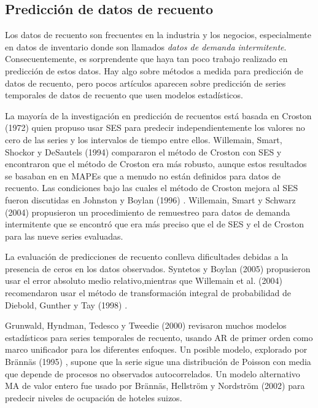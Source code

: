\documentclass{llncs}
\begin{document}
\subsection{Predicción de datos de recuento}
Los datos de recuento son frecuentes en la industria y los negocios, especialmente en datos de inventario donde son llamados \emph{datos de demanda intermitente}. Consecuentemente, es sorprendente que haya tan poco trabajo realizado en predicción de estos datos. Hay algo sobre métodos a medida para predicción de datos de recuento, pero pocos artículos aparecen sobre predicción de series temporales de datos de recuento que usen modelos estadísticos.

La mayoría de la investigación en predicción de recuentos está basada en Croston (1972) \cite{Croston1972289} quien propuso usar SES para predecir independientemente los valores no cero de las series y los intervalos de tiempo entre ellos. Willemain, Smart, Shockor y DeSautels (1994) \cite{Willemain1994529} compararon el método de Croston con SES y encontraron que el método de Croston era más robusto, aunque estos resultados se basaban en en MAPEs que a menudo no están definidos para datos de recuento. Las condiciones bajo las cuales el método de Croston mejora al SES fueron discutidas en Johnston y Boylan (1996) \cite{Johnston1996297}. Willemain, Smart y Schwarz (2004) propusieron un procedimiento de remuestreo para datos de demanda intermitente que se encontró que era más preciso que el de SES y el de Croston para las nueve series evaluadas.

La evaluación de predicciones de recuento conlleva dificultades debidas a la presencia de ceros en los datos observados. Syntetos y Boylan (2005) \cite{Syntetos2005303} propusieron usar el error absoluto medio relativo,mientras que Willemain et al. (2004) \cite{Willemain2004375} recomendaron usar el método de transformación integral de probabilidad de Diebold, Gunther y Tay (1998) \cite{Diebold1998863}.

Grunwald, Hyndman, Tedesco y Tweedie (2000) revisaron muchos modelos estadísticos para series temporales de recuento, usando AR de primer orden como marco unificador para los diferentes enfoques. Un posible modelo, explorado por Brännäs (1995) \cite{Brannas200219}, supone que la serie sigue una distribución de Poisson con media que depende de procesos no observados autocorrelados. Un modelo alternativo MA de valor entero fue usado por Brännäs, Hellström y Nordström (2002) para predecir niveles de ocupación de hoteles suizos.
\end{document}
